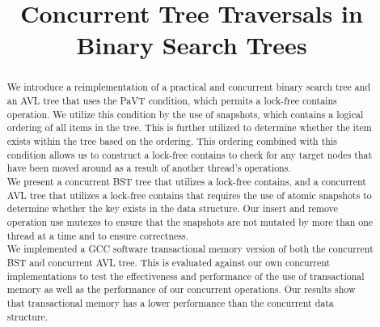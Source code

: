 \documentclass[conference]{IEEEtran}
\theoremstyle{definition}
\theoremstyle{theorem}
\begin{document}
\title{Concurrent Tree Traversals in Binary Search Trees\\
}

\author{
\and
{}
}

\maketitle

\begin{abstract}
We introduce a reimplementation of a practical and concurrent binary search tree and an AVL tree that uses the PaVT condition, which permits a lock-free contains operation. We utilize this condition by the use of snapshots, which contains a logical ordering of all items in the tree. This is further utilized to determine whether the item exists within the tree based on the ordering. This ordering combined with this condition allows us to construct a lock-free contains to check for any target nodes that have been moved around as a result of another thread's operations.\\
We present a concurrent BST tree that utilizes a lock-free contains, and a concurrent AVL tree that utilizes a lock-free contains that requires the use of atomic snapshots to determine whether the key exists in the data structure. Our insert and remove operation use mutexes to ensure that the snapshots are not mutated by more than one thread at a time and to ensure correctness. \\
We implemented a GCC software transactional memory version of both the concurrent BST and concurrent AVL tree. This is evaluated against our own concurrent implementations to test the effectiveness and performance of the use of transactional memory as well as the performance of our concurrent operations. Our results show that transactional memory has a lower performance than the concurrent data structure.
\end{abstract}
\end{document}

